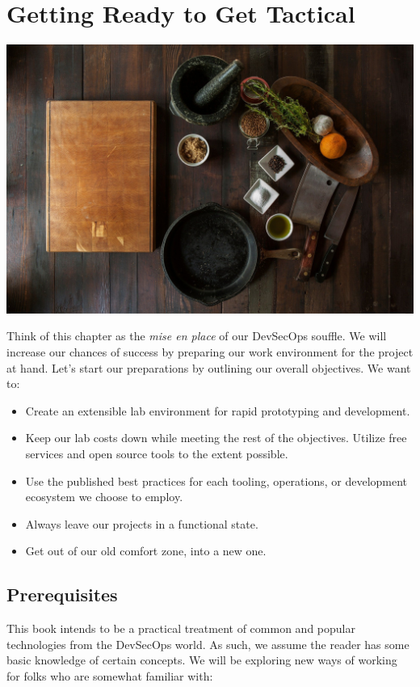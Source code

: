 \chapter{Getting Ready to Get Tactical}

\centering
\includegraphics[scale=0.20]{images/ingredients-498199_1920.jpg}


\justify{}
Think of this chapter as the \emph{mise en place} of our DevSecOps souffle. We will increase our chances of success
by preparing our work environment for the project at hand. Let's start our preparations by outlining our overall objectives.
We want to:

\justify{}
\begin{itemize}
	\item
	      Create an extensible lab environment for rapid prototyping and development.
	\item
	      Keep our lab costs down while meeting the rest of the objectives.
	      Utilize free services and open source tools to the extent possible.
	\item
	      Use the published best practices for each tooling, operations, or
	      development ecosystem we choose to employ.
	\item
	      Always leave our projects in a functional state.
	\item
	      Get out of our old comfort zone, into a new one.
\end{itemize}

\section{Prerequisites}

\justify{}
This book intends to be a practical treatment of common and popular technologies from the DevSecOps world. As such, we assume
the reader has some basic knowledge of certain concepts. We will be exploring new ways of working for folks who
are somewhat familiar with:

